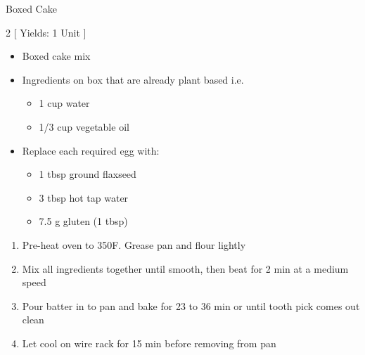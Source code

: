 \begin{Large}
    Boxed Cake
\end{Large}

\begin{scriptsize}
\begin{multicols}{2}
[
\vspace{1em}
Yields: 1 Unit
\vspace{-1.5em}
]

\begin{itemize}
    \item Boxed cake mix
    \item Ingredients on box that are already plant based i.e.\begin{itemize}
        \item 1 cup water
        \item 1/3 cup vegetable oil
    \end{itemize}
    \item Replace each required egg with:\begin{itemize}
        \item 1 tbsp ground flaxseed
        \item 3 tbsp hot tap water
        \item 7.5 g gluten (1 tbsp)
    \end{itemize}
\end{itemize}
\end{multicols}
\end{scriptsize}

\begin{footnotesize}
\begin{enumerate}
    \item Pre-heat oven to 350\degree F. Grease pan and flour lightly
    \item Mix all ingredients together until smooth, then beat for 2 min at a medium speed
    \item Pour batter in to pan and bake for 23 to 36 min or until tooth pick comes out clean
    \item Let cool on wire rack for 15 min before removing from pan

\end{enumerate}
\end{footnotesize}

\vspace{2em}
